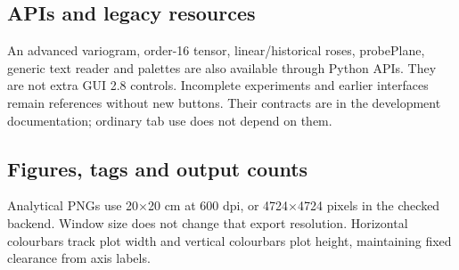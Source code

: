 \subsection{APIs and legacy resources}
An advanced variogram, order-16 tensor, linear/historical roses, probePlane, generic text reader and palettes are also available through Python APIs. They are not extra GUI 2.8 controls. Incomplete experiments and earlier interfaces remain references without new buttons. Their contracts are in the development documentation; ordinary tab use does not depend on them.

\label{sec:exports}
\subsection{Figures, tags and output counts}
Analytical PNGs use 20\(\times\)20 cm at 600 dpi, or 4724\(\times\)4724 pixels in the checked backend. Window size does not change that export resolution. Horizontal colourbars track plot width and vertical colourbars plot height, maintaining fixed clearance from axis labels.

